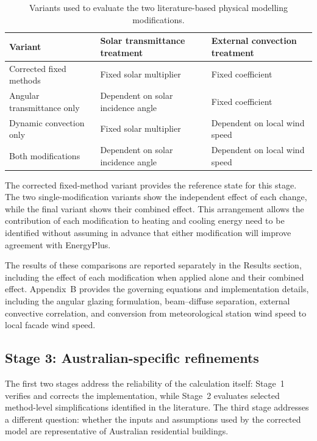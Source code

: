 \documentclass[12pt, a4paper]{article}
\begin{document}
\begin{table}[htbp]
\centering
\caption{Variants used to evaluate the two literature-based physical modelling
modifications.}
\label{tab:variants}
\begin{tabular}{p{3.6cm}p{4.6cm}p{4.6cm}}
\toprule
\textbf{Variant} &
\textbf{Solar transmittance treatment} &
\textbf{External convection treatment} \\
\midrule
Corrected fixed methods &
Fixed solar multiplier &
Fixed coefficient \\

Angular transmittance only &
Dependent on solar incidence angle &
Fixed coefficient \\

Dynamic convection only &
Fixed solar multiplier &
Dependent on local wind speed \\

Both modifications &
Dependent on solar incidence angle &
Dependent on local wind speed \\
\bottomrule
\end{tabular}
\end{table}

The corrected fixed-method variant provides the reference state for this stage.
The two single-modification variants show the independent effect of each
change, while the final variant shows their combined effect. This arrangement
allows the contribution of each modification to heating and cooling energy
need to be identified without assuming in advance that either modification
will improve agreement with EnergyPlus.

The results of these comparisons are reported separately in the Results
section, including the effect of each modification when applied alone and
their combined effect. Appendix~B provides the governing equations and
implementation details, including the angular glazing formulation,
beam--diffuse separation, external convective correlation, and conversion from
meteorological station wind speed to local facade wind speed.

\subsection{Stage 3: Australian-specific refinements}
\label{sec:AU_refinements}

The first two stages address the reliability of the calculation itself:
Stage~1 verifies and corrects the implementation, while Stage~2 evaluates
selected method-level simplifications identified in the literature. The third
stage addresses a different question: whether the inputs and assumptions used
by the corrected model are representative of Australian residential buildings.
\end{document}
